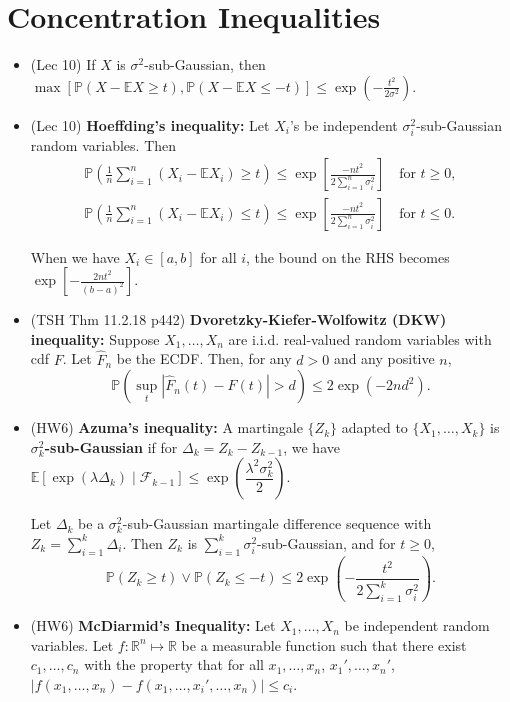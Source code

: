 \documentclass[twoside]{article}
\newcommand{\dis}{\displaystyle}
\newcommand\bbE{\mathbb{E}}
\newcommand\bbP{\mathbb{P}}
\newcommand\bbR{\mathbb{R}}
\newcommand\calF{\mathcal{F}}
\newcommand\Dlt{\Delta}
\newcommand\lmb{\lambda}
\newcommand\sg{\sigma}
\begin{document}
\section{Concentration Inequalities}
\begin{itemize}
\item (Lec 10) If $X$ is $\sg^2$-sub-Gaussian, then $\max [\bbP(X - \bbE X \geq t), \bbP(X - \bbE X \leq -t)] \leq \exp \left( -\dis\frac{t^2}{2\sg^2} \right)$.

\item (Lec 10) \textbf{Hoeffding's inequality:} Let $X_i$'s be independent $\sg_i^2$-sub-Gaussian random variables. Then
\begin{align*}
\bbP \left( \frac{1}{n}\sum_{i=1}^n (X_i - \bbE X_i) \geq t \right) \leq \exp\left[ \frac{-nt^{2}}{2\sum_{i=1}^{n}\sigma_{i}^{2}}\right] \quad \text{for } t \geq 0, \\
\bbP \left( \frac{1}{n}\sum_{i=1}^n (X_i - \bbE X_i) \leq t \right) \leq \exp\left[ \frac{-nt^{2}}{2\sum_{i=1}^{n}\sigma_{i}^{2}}\right] \quad \text{for } t \leq 0.
\end{align*}

When we have $X_i \in [a,b]$ for all $i$, the bound on the RHS becomes $\exp \left[ -\dis\frac{2nt^2}{(b-a)^2} \right]$.

\item (TSH Thm 11.2.18 p442) \textbf{Dvoretzky-Kiefer-Wolfowitz (DKW) inequality:} Suppose $X_1, \dots, X_n$ are i.i.d. real-valued random variables with cdf $F$. Let $\hat{F}_n$ be the ECDF. Then, for any $d > 0$ and any positive $n$,
\[ \bbP \left( \sup_t |\hat{F}_n(t) - F(t)| > d \right) \leq 2 \exp (-2nd^2). \]

\item (HW6) \textbf{Azuma's inequality:} A martingale $\{Z_k\}$ adapted to $\{X_1, \dots, X_k\}$ is \textbf{$\sg_k^2$-sub-Gaussian} if for $\Dlt_k = Z_k - Z_{k-1}$, we have $\bbE \left[\exp(\lmb \Dlt_k) \mid \calF_{k-1} \right] \leq \exp \left(\dfrac{\lmb^2 \sg_k^2}{2} \right)$.

Let $\Dlt_k$ be a $\sg_k^2$-sub-Gaussian martingale difference sequence with $Z_k = \dis\sum_{i=1}^k \Dlt_i$. Then $Z_k$ is $\sum_{i=1}^k \sg_i^2$-sub-Gaussian, and for $t \geq 0$,
\[ \bbP (Z_k \geq t) \vee \bbP (Z_k \leq -t) \leq 2\exp \left( - \frac{t^2}{2 \sum_{i=1}^k \sg_i^2} \right). \]

\item (HW6) \textbf{McDiarmid's Inequality:} Let $X_1, \dots, X_n$ be independent random variables. Let $f: \bbR^n \mapsto \bbR$ be a measurable function such that there exist $c_1, \dots, c_n$ with the property that for all $x_1, \dots, x_n$, $x_1', \dots, x_n'$,
$|f(x_1, \dots, x_n) - f(x_1, \dots, x_i', \dots, x_n)| \leq c_i$.


\end{itemize}
\end{document}

